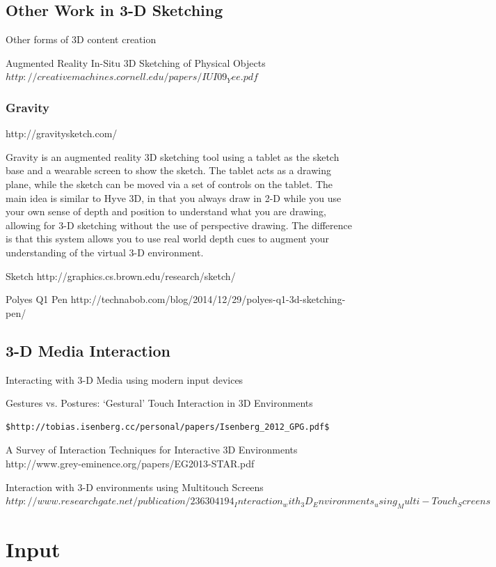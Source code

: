 \documentclass[12pt]{article}
\begin{document}
\subsection{Other Work in 3-D Sketching}

Other forms of 3D content creation

Augmented Reality In-Situ 3D Sketching of Physical Objects $http://creativemachines.cornell.edu/papers/IUI09_Yee.pdf$

\subsubsection{Gravity} http://gravitysketch.com/

Gravity is an augmented reality 3D sketching tool using a tablet as the sketch base and a wearable screen to show the sketch. The tablet acts as a drawing plane, while the sketch can be moved via a set of controls on the tablet. The main idea is similar to Hyve 3D, in that you always draw in 2-D while you use your own sense of depth and position to understand what you are drawing, allowing for 3-D sketching without the use of perspective drawing. The difference is that this system allows you to use real world depth cues to augment your understanding of the virtual 3-D environment.

Sketch http://graphics.cs.brown.edu/research/sketch/

Polyes Q1 Pen http://technabob.com/blog/2014/12/29/polyes-q1-3d-sketching-pen/

\subsection{3-D Media Interaction}

Interacting with 3-D Media using modern input devices

Gestures vs. Postures: ‘Gestural’ Touch Interaction in 3D Environments 

\begin{verbatim}
$http://tobias.isenberg.cc/personal/papers/Isenberg_2012_GPG.pdf$
\end{verbatim}
A Survey of Interaction Techniques for Interactive 3D Environments http://www.grey-eminence.org/papers/EG2013-STAR.pdf

Interaction with 3-D environments using Multitouch Screens $http://www.researchgate.net/publication/236304194_Interaction_with_3D_Environments_using_Multi-Touch_Screens$

\pagebreak
\section{Input}
\end{document}
